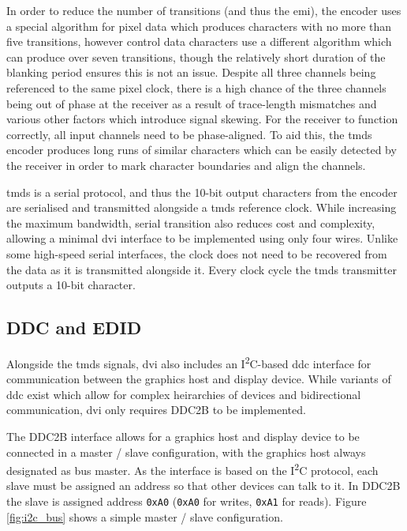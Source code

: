 In order to reduce the number of transitions (and thus the \gls{emi}), the encoder uses a special algorithm for pixel data which produces characters with no more than five transitions, however control data characters use a different algorithm which can produce over seven transitions, though the relatively short duration of the blanking period ensures this is not an issue. Despite all three channels being referenced to the same pixel clock, there is a high chance of the three channels being out of phase at the receiver as a result of trace-length mismatches and various other factors which introduce signal skewing. For the receiver to function correctly, all input channels need to be phase-aligned. To aid this, the \gls{tmds} encoder produces long runs of similar characters which can be easily detected by the receiver in order to mark character boundaries and align the channels.

\gls{tmds} is a serial protocol, and thus the 10-bit output characters from the encoder are serialised and transmitted alongside a \gls{tmds} reference clock. While increasing the maximum bandwidth, serial transition also reduces cost and complexity, allowing a minimal \gls{dvi} interface to be implemented using only four wires. Unlike some high-speed serial interfaces, the clock does not need to be recovered from the data as it is transmitted alongside it. Every clock cycle the \gls{tmds} transmitter outputs a 10-bit character.

\subsection{DDC and EDID}

Alongside the \gls{tmds} signals, \gls{dvi} also includes an I\textsuperscript{2}C-based \gls{ddc} interface for communication between the graphics host and display device. While variants of \gls{ddc} exist which allow for complex heirarchies of devices and bidirectional communication, \gls{dvi} only requires DDC2B to be implemented.

The DDC2B interface allows for a graphics host and display device to be connected in a master / slave configuration, with the graphics host always designated as bus master. As the interface is based on the I\textsuperscript{2}C protocol, each slave must be assigned an address so that other devices can talk to it. In DDC2B the slave is assigned address \texttt{0xA0} (\texttt{0xA0} for writes, \texttt{0xA1} for reads). Figure \ref{fig:i2c_bus} shows a simple master / slave configuration.

